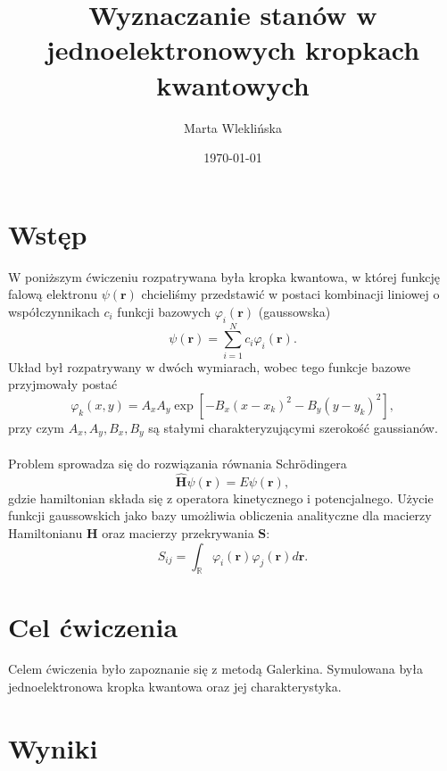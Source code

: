 \documentclass{article}
\title{Wyznaczanie stanów w jednoelektronowych kropkach kwantowych}
\author{Marta Wleklińska}
\date{\today}
\begin{document}
\maketitle



\section{Wstęp}
W poniższym ćwiczeniu rozpatrywana była kropka kwantowa, w której funkcję falową elektronu $\psi(\mathbf{r})$ chcieliśmy przedstawić w postaci kombinacji liniowej o współczynnikach $c_i$ funkcji bazowych $\varphi_i(\mathbf{r})$ (gaussowska)
\begin{equation}
    \psi(\mathbf{r}) = \sum_{i=1}^Nc_i\varphi_i(\mathbf{r}).
\end{equation}
Układ był rozpatrywany w dwóch wymiarach, wobec tego funkcje bazowe przyjmowały postać
\begin{equation}
    \varphi_k (x, y) = A_x A_y \exp\left[-B_x\left(x - x_k\right)^2 - B_y \left(y-y_k  \right) ^2 \right],
\end{equation}
przy czym $A_x, A_y, B_x, B_y$ są stałymi charakteryzującymi szerokość gaussianów.\\
\\
Problem sprowadza się do rozwiązania równania Schr{\"o}dingera
\begin{equation}
\hat{\mathbf{H}} \psi(\mathbf{r}) = E \psi(\mathbf{r}),
\end{equation}
gdzie hamiltonian składa się z operatora kinetycznego i potencjalnego. 
Użycie funkcji gaussowskich jako bazy umożliwia obliczenia analityczne dla macierzy Hamiltonianu $\mathbf{H}$ oraz macierzy przekrywania $\mathbf{S}$:
\begin{equation}
S_{ij} = \int_{\mathbb{R}} \varphi_i(\mathbf{r}) \varphi_j(\mathbf{r}) d\mathbf{r}.
\end{equation}

\section{Cel ćwiczenia}
Celem ćwiczenia było zapoznanie się z metodą Galerkina.
Symulowana była jednoelektronowa kropka kwantowa oraz jej charakterystyka.

\section{Wyniki}
\end{document}
